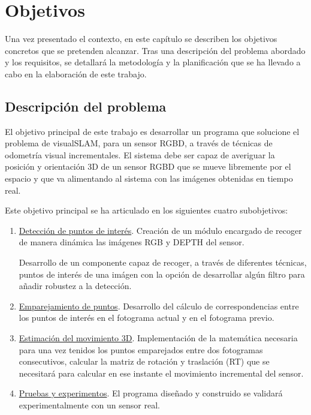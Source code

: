 \chapter{Objetivos}

\label{Chapter2} %

Una vez presentado el contexto, en este capítulo se describen los objetivos concretos que se pretenden alcanzar. Tras una descripción del problema abordado y los requisitos, se detallará la metodología y la planificación que se ha llevado a cabo en la elaboración de este trabajo.

\section{Descripción del problema}

El objetivo principal de este trabajo es desarrollar un programa que solucione el problema de visualSLAM, para un sensor RGBD, a través de técnicas de odometría visual incrementales. El sistema debe ser capaz de averiguar la posición y orientación 3D de un sensor RGBD que se mueve libremente por el espacio y que va alimentando al sistema con las imágenes obtenidas en tiempo real.

Este objetivo principal se ha articulado en los siguientes cuatro subobjetivos:

\begin{enumerate}
 
\item \underline{Detección de puntos de interés}.
Creación de un módulo encargado de recoger de manera dinámica las imágenes RGB y DEPTH del sensor.

Desarrollo de un componente capaz de recoger, a través de diferentes técnicas, puntos de interés de una imágen con la opción de desarrollar algún filtro para añadir robustez a la detección.

\item \underline{Emparejamiento de puntos}.
Desarrollo del cálculo de correspondencias entre los puntos de interés en el fotograma actual y en el fotograma previo.

\item \underline{Estimación del movimiento 3D}.
Implementación de la matemática necesaria para una vez tenidos los puntos emparejados entre dos fotogramas consecutivos, calcular la matriz de rotación y traslación (RT) que se necesitará para calcular en ese instante el movimiento incremental del sensor.

\item \underline{Pruebas y experimentos}.
El programa diseñado y construido se validará experimentalmente con un sensor real.

\end{enumerate}

